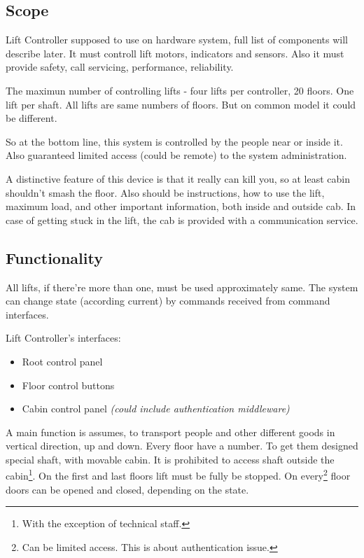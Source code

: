 \documentclass[a4paper,11pt]{article}
\begin{document}
\subsection{Scope}

Lift Controller supposed to use on hardware system, full list of components will describe later. It must controll lift motors, indicators and sensors. Also it must provide safety, call servicing, performance, reliability.

The maximun number of controlling lifts - four lifts per controller, 20 floors. One lift per shaft. All lifts are same numbers of floors. But on common model it could be different.

So at the bottom line, this system is controlled by the people near or inside it. Also guaranteed limited access (could be remote) to the system administration.

A distinctive feature of this device is that it really can kill you, so at least cabin shouldn't smash the floor. Also should be instructions, how to use the lift, maximum load, and other important information, both inside and outside cab. In case of getting stuck in the lift, the cab is provided with a communication service.

\subsection{Functionality}
All lifts, if there're more than one, must be used approximately same. The system can change state (according current) by commands received from command interfaces.

Lift Controller's interfaces:

{\ttfamily
\begin{itemize}
  \item
  Root control panel
  \item
  Floor control buttons
  \item
  Cabin control panel {\itshape\small\color{SlateGray}(could include authentication middleware)}
\end{itemize}
}

A main function is assumes, to transport people and other different goods in vertical direction, up and down. Every floor have a number. To get them designed special shaft, with movable cabin. It is prohibited to access shaft outside the cabin\footnote{%
With the exception of technical staff.}.
On the first and last floors lift must be fully be stopped. On every\footnote{%
Can be limited access. This is about authentication issue.}
floor doors can be opened and closed, depending on the state.
\end{document}
